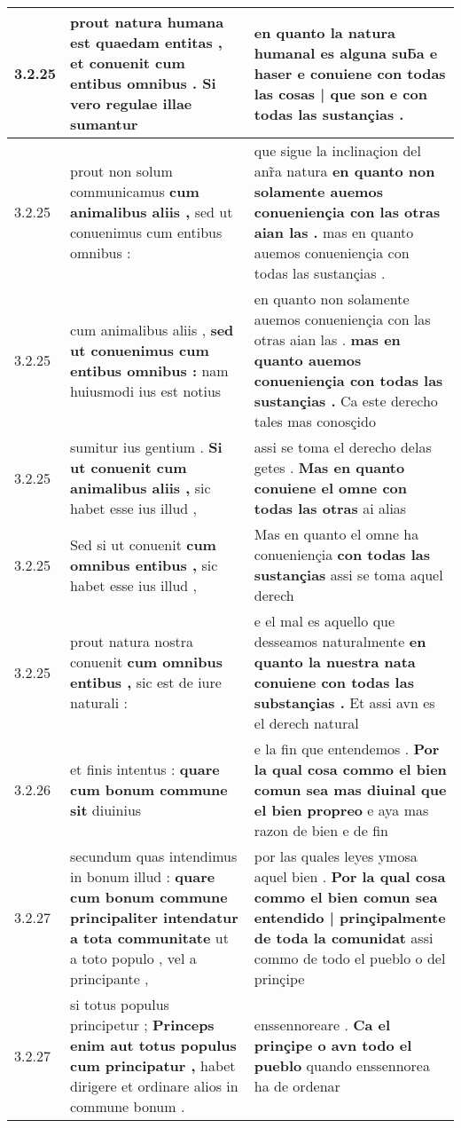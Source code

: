 \begin{tabular}{|p{1cm}|p{6.5cm}|p{6.5cm}|}
3.2.25 & prout natura humana est quaedam entitas , \textbf{ et conuenit cum entibus omnibus . } Si vero regulae illae sumantur & en quanto la natura humanal es alguna sub̃a e haser \textbf{ e conuiene con todas las cosas | que son } e con todas las sustançias . \\\hline
3.2.25 & prout non solum communicamus \textbf{ cum animalibus aliis , } sed ut conuenimus cum entibus omnibus : & que sigue la inclinaçion del anr̃a natura \textbf{ en quanto non solamente auemos conueniençia con las otras aian las . } mas en quanto auemos conueniençia con todas las sustançias . \\\hline
3.2.25 & cum animalibus aliis , \textbf{ sed ut conuenimus cum entibus omnibus : } nam huiusmodi ius est notius & en quanto non solamente auemos conueniençia con las otras aian las . \textbf{ mas en quanto auemos conueniençia con todas las sustançias . } Ca este derecho tales mas conosçido \\\hline
3.2.25 & sumitur ius gentium . \textbf{ Si ut conuenit cum animalibus aliis , } sic habet esse ius illud , & assi se toma el derecho delas getes . \textbf{ Mas en quanto conuiene el omne con todas las otras } ai alias \\\hline
3.2.25 & Sed si ut conuenit \textbf{ cum omnibus entibus , } sic habet esse ius illud , & Mas en quanto el omne ha conueniençia \textbf{ con todas las sustançias } assi se toma aquel derech \\\hline
3.2.25 & prout natura nostra conuenit \textbf{ cum omnibus entibus , } sic est de iure naturali : & e el mal es aquello que desseamos naturalmente \textbf{ en quanto la nuestra nata conuiene con todas las substançias . } Et assi avn es el derech natural \\\hline
3.2.26 & et finis intentus : \textbf{ quare cum bonum commune sit } diuinius & e la fin que entendemos . \textbf{ Por la qual cosa commo el bien comun sea mas diuinal que el bien propreo } e aya mas razon de bien e de fin \\\hline
3.2.27 & secundum quas intendimus in bonum illud : \textbf{ quare cum bonum commune principaliter intendatur a tota communitate } ut a toto populo , vel a principante , & por las quales leyes ymosa aquel bien . \textbf{ Por la qual cosa commo el bien comun sea entendido | prinçipalmente de toda la comunidat } assi commo de todo el pueblo o del prinçipe \\\hline
3.2.27 & si totus populus principetur ; \textbf{ Princeps enim aut totus populus cum principatur , } habet dirigere et ordinare alios in commune bonum . & enssennoreare . \textbf{ Ca el prinçipe o avn todo el pueblo } quando enssennorea ha de ordenar \\\hline

\end{tabular}
